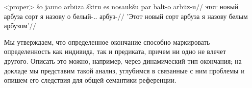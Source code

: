 \documentclass[a4paper, 12pt]{article}
\begin{document}
\ex<proper>
    \begingl
        \gla šo jauno arbūza šķiru es nosaukšu par balt-o arbūz-u//
        \glb этот новый арбуза сорт я назову о белый-\M.\Def.\Acc{} арбуз-\Acc{}//
        \glft 'Этот новый сорт арбуза я назову белым арбузом'//
    \endgl
\xe

Мы утверждаем, что определенное окончание способно маркировать определенность как индивида, так и предиката, причем ни одно не влечет другого. Описать это можно, например, через динамический тип окончания; на докладе мы представим такой анализ, углубимся в связанные с ним проблемы и опишем его следствия для общей семантики референции.

\printglossaries



\end{document}
